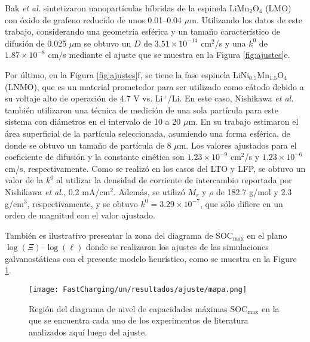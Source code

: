 Bak \textit{et al.} \cite{bak2011} sintetizaron nanopartículas híbridas de la 
espinela LiMn$_2$O$_4$ (LMO) con óxido de grafeno reducido de unos 0.01--0.04 
$\mu$m. Utilizando los datos de este trabajo, considerando una geometría esférica y un tamaño característico de 
difusión de 0.025 $\mu$m se obtuvo un $D$ de $3.51\times10^{-14}$ cm$^2$/s y una
$k^0$ de $1.87\times10^{-8}$ cm/s mediante el ajuste que se muestra en la Figura 
\ref{fig:ajustes}e.

Por último, en la Figura \ref{fig:ajustes}f, se tiene la fase espinela 
LiNi$_{0.5}$Mn$_{1.5}$O$_4$ (LNMO), que es un material prometedor para ser 
utilizado como cátodo debido a su voltaje alto de operación de 4.7 V vs. Li$^+$/Li. 
En este caso, Nishikawa \textit{et al.} \cite{nishikawa2017} también
utilizaron una técnica de medición de una sola partícula para este sistema con 
diámetros en el intervalo de 10 a 20 $\mu$m. En su trabajo estimaron el área 
superficial de la partícula seleccionada, asumiendo una forma esférica, de donde
se obtuvo un tamaño de partícula de 8 $\mu$m. Los valores ajustados para el
coeficiente de difusión y la constante cinética son $1.23\times10^{-9}$ cm$^2$/s 
y $1.23\times10^{-6}$ cm/s, respectivamente. Como se realizó en los casos del 
LTO y LFP, se obtuvo un valor de la $k^0$ al utilizar la densidad de corriente
de intercambio reportada por Nishikawa \textit{et al.}, 0.2 mA/cm$^2$. Además,
se utilizó $M_r$ y $\rho$ de 182.7 g/mol y 2.3 g/cm$^3$, respectivamente, y se
obtuvo $k^0 = 3.29\times10^{-7}$, que sólo difiere en un orden de magnitud con 
el valor ajustado.

También es ilustrativo presentar la zona del diagrama de SOC$_{\max}$ en el plano $\log(\Xi)$--$\log(\ell)$ donde se realizaron los ajustes de las simulaciones galvanostáticas con el presente modelo 
heurístico, 
como se muestra en la Figure \ref{fig:ajustes-mapa}.
\begin{figure}[h!]
    \centering
    \texttt{[image: FastCharging/un/resultados/ajuste/mapa.png]}
    \caption{Región del diagrama de nivel de capacidades máximas SOC$_{\max}$ en la que se encuentra cada uno de los experimentos de literatura analizados aquí
    \cite{mancini2022, he2012, lei2015, wang2019high, bak2011, nishikawa2017}
    luego del ajuste.}
    \label{fig:ajustes-mapa}
\end{figure}


